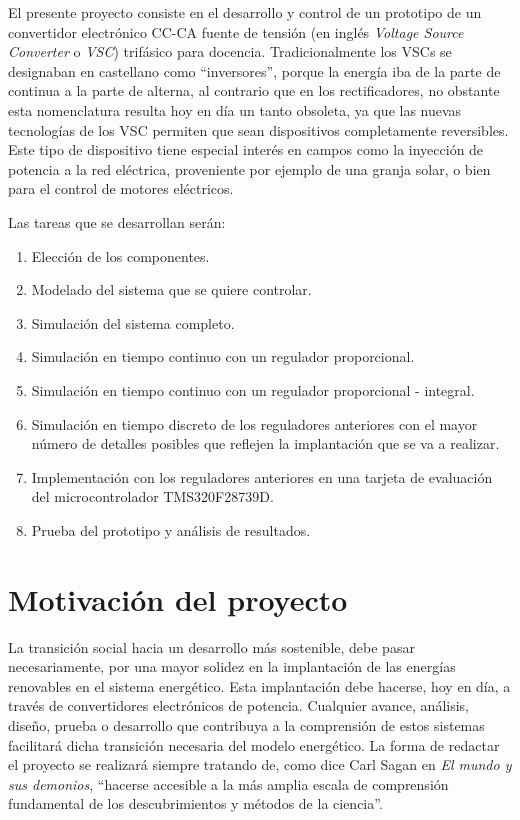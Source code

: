 \documentclass{report}
\begin{document}
El presente proyecto consiste en el desarrollo y control de un prototipo de un convertidor electrónico CC-CA fuente de tensión (en inglés \textit{Voltage Source Converter} o \textit{VSC}) trifásico para docencia. Tradicionalmente los VSCs se designaban en castellano como ``inversores'', porque la energía iba de la parte de continua a la parte de alterna, al contrario que en los rectificadores, no obstante esta nomenclatura resulta hoy en día un tanto obsoleta, ya que las nuevas tecnologías de los VSC permiten que sean dispositivos completamente reversibles. Este tipo de dispositivo tiene especial interés en campos como la inyección de potencia a la red eléctrica, proveniente por ejemplo de una granja solar, o bien para el control de motores eléctricos. 

Las tareas que se desarrollan serán:
\begin{enumerate}
    \item Elección de los componentes.
    \item Modelado del sistema que se quiere controlar.
    \item Simulación del sistema completo.
    \item Simulación en tiempo continuo con un regulador proporcional.
    \item Simulación en tiempo continuo con un regulador proporcional - integral.
    \item Simulación en tiempo discreto de los reguladores anteriores con el mayor número de detalles posibles que reflejen la implantación que se va a realizar.
    \item Implementación con los reguladores anteriores en una tarjeta de evaluación del microcontrolador TMS320F28739D.
    \item Prueba del prototipo y análisis de resultados.
\end{enumerate}


\section{Motivación del proyecto} \label{sec.motivaciondelproyecto}

La transición social hacia un desarrollo más sostenible, debe pasar necesariamente, por una mayor solidez en la implantación de las energías renovables en el sistema energético. Esta implantación debe hacerse, hoy en día, a través de convertidores electrónicos de potencia. Cualquier avance, análisis, diseño, prueba o desarrollo  que contribuya a la comprensión de estos sistemas facilitará dicha transición necesaria del modelo energético. La forma de redactar el proyecto se realizará siempre tratando de, como dice Carl Sagan en \textit{El mundo y sus demonios}\cite{cincuenta}, \enquote{hacerse accesible a la más amplia escala de comprensión fundamental de los descubrimientos y métodos de la ciencia}.
\end{document}
